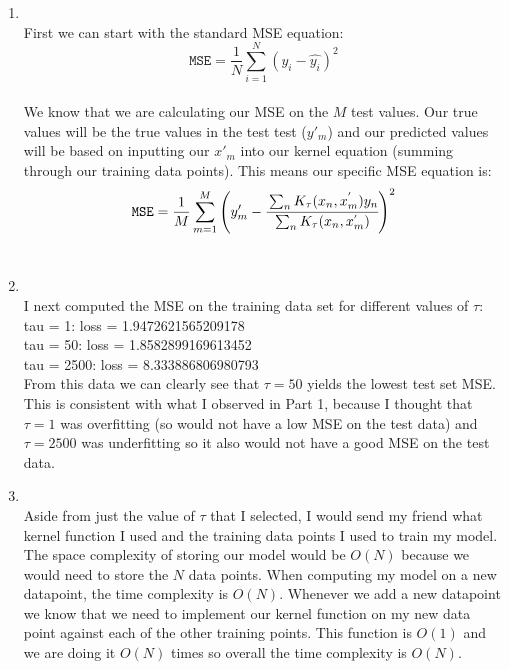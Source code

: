 \documentclass[submit]{harvardml}
\begin{document}
\begin{enumerate}
    \item\\
    First we can start with the standard MSE equation:
    \begin{equation*}
       \texttt{MSE} = \frac{1}{N} \sum_{i=1}^N\left(y_i - \hat{y_i}\right)^2
    \end{equation*}\\
    We know that we are calculating our MSE on the $M$ test values. Our true values will be the true values in the test test ($y'_m$) and our predicted values will be based on inputting our $x'_m$ into our kernel equation (summing through our training data points). This means our specific MSE equation is:\\
    \begin{equation*}
       \texttt{MSE} = \frac{1}{M} \sum_{m=1}^M\left(y'_m - \cfrac{\sum_{n} K_\tau(x_n,x^{'}_m) y_n}{\sum_n K_\tau(x_n, x^{'}_m)} \right)^2
    \end{equation*}\\
    \item\\
    I next computed the MSE on the training data set for different values of $\tau$:\\
    tau = 1: loss = 1.9472621565209178\\
    tau = 50: loss = 1.8582899169613452\\
    tau = 2500: loss = 8.333886806980793\\
    From this data we can clearly see that $\tau=50$ yields the lowest test set MSE. This is consistent with what I observed in Part 1, because I thought that $\tau=1$ was overfitting (so would not have a low MSE on the test data) and $\tau=2500$ was underfitting so it also would not have a good MSE on the test data.\\
    \item\\
    Aside from just the value of $\tau$ that I selected, I would send my friend what kernel function I used and the training data points I used to train my model. The space complexity of storing our model would be $O(N)$ because we would need to store the $N$ data points. When computing my model on a new datapoint, the time complexity is $O(N)$. Whenever we add a new datapoint we know that we need to implement our kernel function on my new data point against each of the other training points. This function is $O(1)$ and we are doing it $O(N)$ times so overall the time complexity is $O(N)$.

\end{enumerate}
\end{document}
